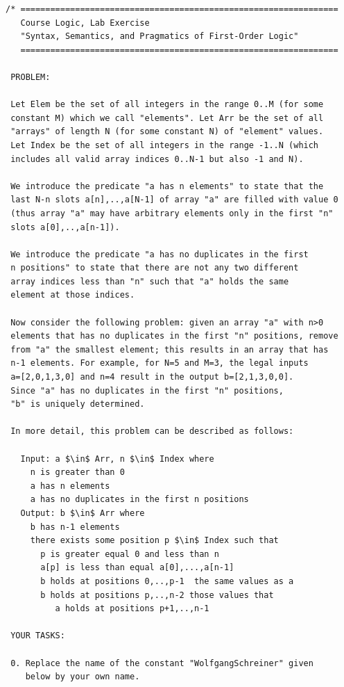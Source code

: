 \documentclass{article}
\begin{document}
\pagebreak

\begin{lstlisting}[mathescape=true, columns=flexible]
/* ================================================================
   Course Logic, Lab Exercise 
   "Syntax, Semantics, and Pragmatics of First-Order Logic"
   ================================================================
 
 PROBLEM:
 
 Let Elem be the set of all integers in the range 0..M (for some 
 constant M) which we call "elements". Let Arr be the set of all
 "arrays" of length N (for some constant N) of "element" values.
 Let Index be the set of all integers in the range -1..N (which
 includes all valid array indices 0..N-1 but also -1 and N).
 
 We introduce the predicate "a has n elements" to state that the
 last N-n slots a[n],..,a[N-1] of array "a" are filled with value 0 
 (thus array "a" may have arbitrary elements only in the first "n" 
 slots a[0],..,a[n-1]).
 
 We introduce the predicate "a has no duplicates in the first
 n positions" to state that there are not any two different 
 array indices less than "n" such that "a" holds the same 
 element at those indices.
 
 Now consider the following problem: given an array "a" with n>0
 elements that has no duplicates in the first "n" positions, remove 
 from "a" the smallest element; this results in an array that has 
 n-1 elements. For example, for N=5 and M=3, the legal inputs 
 a=[2,0,1,3,0] and n=4 result in the output b=[2,1,3,0,0].
 Since "a" has no duplicates in the first "n" positions, 
 "b" is uniquely determined.
 
 In more detail, this problem can be described as follows:
 
   Input: a $\in$ Arr, n $\in$ Index where
     n is greater than 0 
     a has n elements
     a has no duplicates in the first n positions
   Output: b $\in$ Arr where
     b has n-1 elements
     there exists some position p $\in$ Index such that
       p is greater equal 0 and less than n
       a[p] is less than equal a[0],...,a[n-1]
       b holds at positions 0,..,p-1  the same values as a
       b holds at positions p,..,n-2 those values that 
          a holds at positions p+1,..,n-1
 
 YOUR TASKS: 
 
 0. Replace the name of the constant "WolfgangSchreiner" given
    below by your own name.
 

\end{lstlisting}
\end{document}
